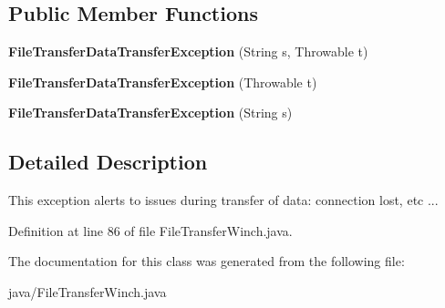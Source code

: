 \subsection*{Public Member Functions}
\begin{DoxyCompactItemize}
\item 
{\bfseries File\+Transfer\+Data\+Transfer\+Exception} (String s, Throwable t)\label{classorg_1_1smallfoot_1_1filexfer_1_1FileTransferWinch_1_1FileTransferDataTransferException_a7eebb8f05696cd7cfd131b36ca392895}

\item 
{\bfseries File\+Transfer\+Data\+Transfer\+Exception} (Throwable t)\label{classorg_1_1smallfoot_1_1filexfer_1_1FileTransferWinch_1_1FileTransferDataTransferException_a730a4e8226d9a8b6cd43aa50687e854c}

\item 
{\bfseries File\+Transfer\+Data\+Transfer\+Exception} (String s)\label{classorg_1_1smallfoot_1_1filexfer_1_1FileTransferWinch_1_1FileTransferDataTransferException_a3609c8674a0be3d2ecc75870110a95ff}

\end{DoxyCompactItemize}


\subsection{Detailed Description}
This exception alerts to issues during transfer of data\+: connection lost, etc ... 



Definition at line 86 of file File\+Transfer\+Winch.\+java.



The documentation for this class was generated from the following file\+:\begin{DoxyCompactItemize}
\item 
java/File\+Transfer\+Winch.\+java\end{DoxyCompactItemize}
